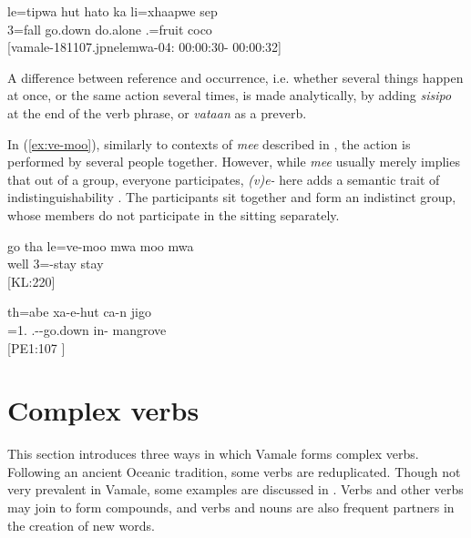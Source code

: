 \ea\label{ex:tipwa_hato}\gll le=tipwa hut hato ka li=xhaapwe sep\\
 3=fall go.down do.alone  .=fruit coco\\
\glt {} {[vamale-181107.jpnelemwa-04: 00:00:30- 00:00:32]}
\z

A difference between reference and occurrence, i.e. whether several things happen at once, or the same action several times, is made analytically, by adding \textit{sisipo}  at the end of the verb phrase, or \textit{vataan}  as a preverb. 

In (\ref{ex:ve-moo}), similarly to contexts of \textit{mee}  described in , the action is performed by several people together. However, while \textit{mee} usually merely implies that out of a group, everyone participates, \textit{(v)e-} here adds a semantic trait of indistinguishability \parencite[66--73]{kemmer_middle_1993}. The participants sit together and form an indistinct group, whose members do not participate in the sitting separately.


\ea \label{ex:ve-moo}
\gll go tha le=ve-moo mwa moo mwa \\
 well  3=-stay  stay \\
\glt {} {[KL:220]}
\z


\ea
\gll th=abe xa-e-hut ca-n jigo\\
 =1. .--go.down in- mangrove\\
\glt {} {[PE1:107 ]}
\z


\section{Complex verbs}
\label{sec:ComplexV}
This section introduces three ways in which Vamale forms complex verbs. Following an ancient Oceanic tradition, some verbs are reduplicated. Though not very prevalent in Vamale, some examples are discussed in . Verbs and other verbs may join to form compounds, and verbs and nouns are also frequent partners in the creation of new words. 

